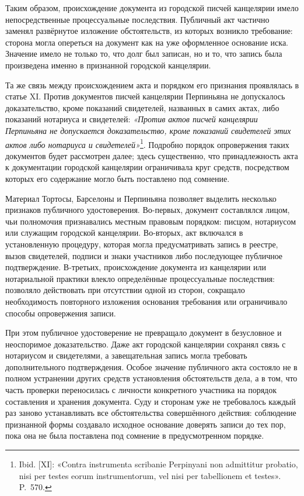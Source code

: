 Таким образом, происхождение документа из городской писчей канцелярии имело непосредственные процессуальные последствия. Публичный акт частично заменял развёрнутое изложение обстоятельств, из которых возникло требование: сторона могла опереться на документ как на уже оформленное основание иска. Значение имело не только то, что долг был записан, но и то, что запись была произведена именно в признанной городской канцелярии.

Та же связь между происхождением акта и порядком его признания проявлялась в статье XI. Против документов писчей канцелярии Перпиньяна не допускалось доказательство, кроме показаний свидетелей, названных в самих актах, либо показаний нотариуса и свидетелей: \emph{«Против актов писчей канцелярии Перпиньяна не допускается доказательство, кроме }\emph{показаний свидетелей этих актов либо нотариуса и свидетелей»}\footnote{Ibid. [XI]: «Contra instrumenta scribanie Perpinyani non admittitur probatio, nisi per testes eorum instrumentorum, vel nisi per tabellionem et testes». P.~570.}. Подробно порядок опровержения таких документов будет рассмотрен далее; здесь существенно, что принадлежность акта к документации городской канцелярии ограничивала круг средств, посредством которых его содержание могло быть поставлено под сомнение.

Материал Тортосы, Барселоны и Перпиньяна позволяет выделить несколько признаков публичного удостоверения. Во-первых, документ составлялся лицом, чьи полномочия признавались местным правовым порядком: писцом, нотариусом или служащим городской канцелярии. Во-вторых, акт включался в установленную процедуру, которая могла предусматривать запись в реестре, вызов свидетелей, подписи и знаки участников либо последующее публичное подтверждение. В-третьих, происхождение документа из канцелярии или нотариальной практики влекло определённые процессуальные последствия: позволяло действовать при отсутствии одной из сторон, сокращало необходимость повторного изложения основания требования или ограничивало способы опровержения записи.

При этом публичное удостоверение не превращало документ в безусловное и неоспоримое доказательство. Даже акт городской канцелярии сохранял связь с нотариусом и свидетелями, а завещательная запись могла требовать дополнительного подтверждения. Особое значение публичного акта состояло не в полном устранении других средств установления обстоятельств дела, а в том, что часть проверки переносилась с личности конкретного участника на порядок составления и хранения документа. Суду и сторонам уже не требовалось каждый раз заново устанавливать все обстоятельства совершённого действия: соблюдение признанной формы создавало исходное основание доверять записи до тех пор, пока она не была поставлена под сомнение в предусмотренном порядке.

